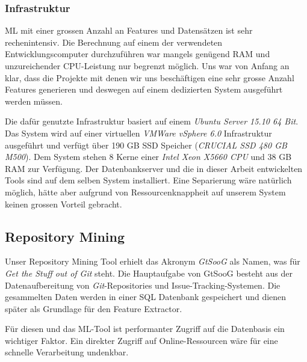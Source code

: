 \documentclass[10pt, a4paper]{article}
\begin{document}

\subsubsection{Infrastruktur} \label{sec:infrastructure}

\ac{ML} mit einer grossen Anzahl an Features und Datensätzen ist sehr rechenintensiv. Die Berechnung auf einem der verwendeten Entwicklungscomputer durchzuführen war mangels genügend RAM und unzureichender CPU-Leistung nur begrenzt möglich. Uns war von Anfang an klar, dass die Projekte mit denen wir uns beschäftigen eine sehr grosse Anzahl Features generieren und deswegen auf einem dedizierten System ausgeführt werden müssen.

Die dafür genutzte Infrastruktur basiert auf einem \emph{Ubuntu Server 15.10 64 Bit}. Das System wird auf einer virtuellen \emph{VMWare vSphere 6.0} Infrastruktur ausgeführt und verfügt über 190 GB SSD Speicher (\emph{CRUCIAL SSD 480 GB M500}). Dem System stehen 8 Kerne einer \emph{Intel Xeon X5660 CPU} und 38 GB RAM zur Verfügung.
Der Datenbankserver und die in dieser Arbeit entwickelten Tools sind auf dem selben System installiert. Eine Separierung wäre natürlich möglich, hätte aber aufgrund von Ressourcenknappheit auf unserem System keinen grossen Vorteil gebracht.

\subsection{Repository Mining}\label{repositorymining}
Unser Repository Mining Tool erhielt das Akronym \emph{GtSooG} als Namen, was für \emph{Get the Stuff out of Git} steht. Die Hauptaufgabe von GtSooG besteht aus der Datenaufbereitung von \emph{Git}-Repositories und Issue-Tracking-Systemen. Die gesammelten Daten werden in einer SQL Datenbank gespeichert und dienen später als Grundlage für den Feature Extractor. 

Für diesen und das \ac{ML}-Tool ist performanter Zugriff auf die Datenbasis ein wichtiger Faktor. Ein direkter Zugriff auf Online-Ressourcen wäre für eine schnelle Verarbeitung undenkbar. 
\end{document}
